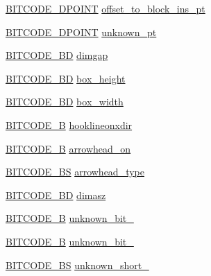 \begin{DoxyCompactItemize}
\item 
\hyperlink{dwg_8h_a28caf4c2afeb01c45b68490ea6d81113}{\-B\-I\-T\-C\-O\-D\-E\-\_\-D\-P\-O\-I\-N\-T} \hyperlink{struct__dwg__entity__LEADER_ac1b7d15c8669a55c736ab0992965a77c}{offset\-\_\-to\-\_\-block\-\_\-ins\-\_\-pt}
\item 
\hyperlink{dwg_8h_a28caf4c2afeb01c45b68490ea6d81113}{\-B\-I\-T\-C\-O\-D\-E\-\_\-D\-P\-O\-I\-N\-T} \hyperlink{struct__dwg__entity__LEADER_a368407a7f00393129115b3cf3ec08a61}{unknown\-\_\-pt}
\item 
\hyperlink{dwg_8h_a3c1e6781466b74ba07785d57da70ed97}{\-B\-I\-T\-C\-O\-D\-E\-\_\-\-B\-D} \hyperlink{struct__dwg__entity__LEADER_a0164842bbf64f5358791da878dc33315}{dimgap}
\item 
\hyperlink{dwg_8h_a3c1e6781466b74ba07785d57da70ed97}{\-B\-I\-T\-C\-O\-D\-E\-\_\-\-B\-D} \hyperlink{struct__dwg__entity__LEADER_a9141b2d2b0902c762b889dadbe56d3f2}{box\-\_\-height}
\item 
\hyperlink{dwg_8h_a3c1e6781466b74ba07785d57da70ed97}{\-B\-I\-T\-C\-O\-D\-E\-\_\-\-B\-D} \hyperlink{struct__dwg__entity__LEADER_a4639b773bf4066ba4873cb35531178e6}{box\-\_\-width}
\item 
\hyperlink{dwg_8h_ab533b1f62d9086749e3bb5b67e9f224e}{\-B\-I\-T\-C\-O\-D\-E\-\_\-\-B} \hyperlink{struct__dwg__entity__LEADER_affbb386acad61340e0be9e054e37debf}{hooklineonxdir}
\item 
\hyperlink{dwg_8h_ab533b1f62d9086749e3bb5b67e9f224e}{\-B\-I\-T\-C\-O\-D\-E\-\_\-\-B} \hyperlink{struct__dwg__entity__LEADER_a43b95bb5d573c09783fdf3a1904fda09}{arrowhead\-\_\-on}
\item 
\hyperlink{dwg_8h_a94297606fbd4a4ff97e8add284af0809}{\-B\-I\-T\-C\-O\-D\-E\-\_\-\-B\-S} \hyperlink{struct__dwg__entity__LEADER_a9ad7051fea8f05d5f133c466edc4c3b6}{arrowhead\-\_\-type}
\item 
\hyperlink{dwg_8h_a3c1e6781466b74ba07785d57da70ed97}{\-B\-I\-T\-C\-O\-D\-E\-\_\-\-B\-D} \hyperlink{struct__dwg__entity__LEADER_ae8e06e098e1b2de47f0f697c1f658678}{dimasz}
\item 
\hyperlink{dwg_8h_ab533b1f62d9086749e3bb5b67e9f224e}{\-B\-I\-T\-C\-O\-D\-E\-\_\-\-B} \hyperlink{struct__dwg__entity__LEADER_a2e05b2e7536db226733abbfb95fdeeb2}{unknown\-\_\-bit\-\_}
\item 
\hyperlink{dwg_8h_ab533b1f62d9086749e3bb5b67e9f224e}{\-B\-I\-T\-C\-O\-D\-E\-\_\-\-B} \hyperlink{struct__dwg__entity__LEADER_af5aa45512c7d518e122fb739a5eea25b}{unknown\-\_\-bit\-\_}
\item 
\hyperlink{dwg_8h_a94297606fbd4a4ff97e8add284af0809}{\-B\-I\-T\-C\-O\-D\-E\-\_\-\-B\-S} \hyperlink{struct__dwg__entity__LEADER_a718901a5a6274cc0e3939b89af074de1}{unknown\-\_\-short\-\_}

\end{DoxyCompactItemize}
